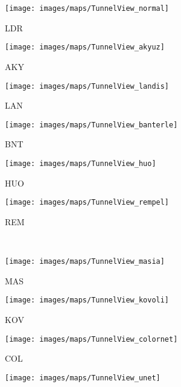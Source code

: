 \documentclass{egpubl}
\begin{document}
\begin{figure*}[htb]
    \centering
    \begin{subfigure}[t]{0.13\linewidth}
        \centering
        \texttt{[image: images/maps/TunnelView\_normal]}
        \caption{LDR}
    \end{subfigure}
    \begin{subfigure}[t]{0.13\linewidth}
        \centering
        \texttt{[image: images/maps/TunnelView\_akyuz]}
        \caption{AKY}
    \end{subfigure}
    \begin{subfigure}[t]{0.13\linewidth}
        \centering
        \texttt{[image: images/maps/TunnelView\_landis]}
        \caption{LAN}
    \end{subfigure}
    \begin{subfigure}[t]{0.13\linewidth}
        \centering
        \texttt{[image: images/maps/TunnelView\_banterle]}
        \caption{BNT}
    \end{subfigure}
    \begin{subfigure}[t]{0.13\linewidth}
        \centering
        \texttt{[image: images/maps/TunnelView\_huo]}
        \caption{HUO}
    \end{subfigure}
    \begin{subfigure}[t]{0.13\linewidth}
        \centering
        \texttt{[image: images/maps/TunnelView\_rempel]}
        \caption{REM}
    \end{subfigure}\\
    \begin{subfigure}[t]{0.13\linewidth}
        \centering
        \texttt{[image: images/maps/TunnelView\_masia]}
        \caption{MAS}
    \end{subfigure}
    \begin{subfigure}[t]{0.13\linewidth}
        \centering
        \texttt{[image: images/maps/TunnelView\_kovoli]}
        \caption{KOV}
    \end{subfigure}
    \begin{subfigure}[t]{0.13\linewidth}
        \centering
        \texttt{[image: images/maps/TunnelView\_colornet]}
        \caption{COL}
    \end{subfigure}
    \begin{subfigure}[t]{0.13\linewidth}
        \centering
        \texttt{[image: images/maps/TunnelView\_unet]}

\end{subfigure}
\end{figure*}
\end{document}
